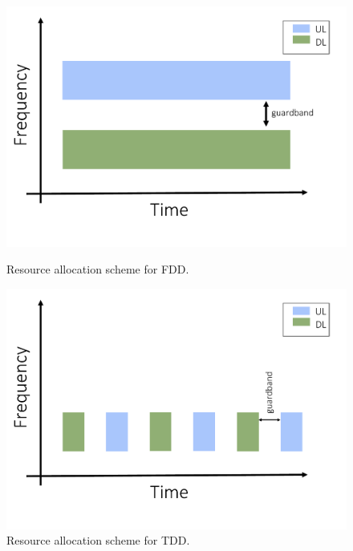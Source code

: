 \begin{figure}[!h]
  \centering
  \begin{minipage}[b]{0.45\textwidth}
      \includegraphics[width=\textwidth]{../images/FDDResourceAllocation.pdf}
    \caption{Resource allocation scheme for \acs{FDD}.}
    \label{fig:FDD}
  \end{minipage}
\hspace*{\fill}
  \begin{minipage}[b]{0.45\textwidth}
    \includegraphics[width=\textwidth]{../images/TDDResourceAllocation.pdf}
    \caption{Resource allocation scheme for \acs{TDD}.}
    \label{fig:TDD}
  \end{minipage}
\end{figure}



